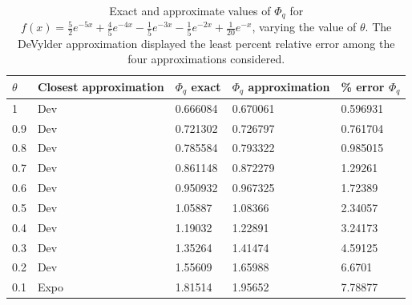 \begin{table}[!h]
\begin{tabular}{|l|l|l|l|l|}
\hline
$\theta$ & Closest approximation & $\Phi_q$   exact & $\Phi_q$ approximation & \% error   $\Phi_q$ \\ \hline
1   & Dev                     & 0.666084       & 0.670061 & 0.596931          \\ \hline
0.9 & Dev                     & 0.721302       & 0.726797 & 0.761704          \\ \hline
0.8 & Dev                     & 0.785584       & 0.793322 & 0.985015          \\ \hline
0.7 & Dev                     & 0.861148       & 0.872279 & 1.29261           \\ \hline
0.6 & Dev                     & 0.950932       & 0.967325 & 1.72389           \\ \hline
0.5 & Dev                     & 1.05887        & 1.08366  & 2.34057           \\ \hline
0.4 & Dev                     & 1.19032        & 1.22891  & 3.24173           \\ \hline
0.3 & Dev                     & 1.35264        & 1.41474  & 4.59125           \\ \hline
0.2 & Dev                     & 1.55609        & 1.65988  & 6.6701            \\ \hline
0.1 & Expo                    & 1.81514        & 1.95652  & 7.78877           \\ \hline
\end{tabular}
\caption{Exact and approximate values of $\Phi_q$ for $f(x)=\frac{5}{2 }e^{-5x}+\frac{4}{5} e^{-4 x}-\frac{1}{5}e^{-3x}- \frac{1}{5}e^{-2x}+ \frac{1}{20}e^{-x}$, varying the value of $\theta$. The DeVylder approximation displayed the least percent relative error among the four approximations considered.}
\label{table:NH5mmPhiq}
\end{table}


